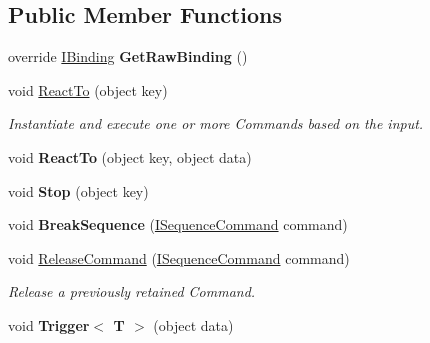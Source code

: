\subsection*{Public Member Functions}
\begin{DoxyCompactItemize}
\item 
\hypertarget{classbabel_1_1extensions_1_1sequencer_1_1impl_1_1_sequencer_a0fe228eb137de84cd46b58487ceb7c76}{override \hyperlink{interfacebabel_1_1framework_1_1api_1_1_i_binding}{I\-Binding} {\bfseries Get\-Raw\-Binding} ()}\label{classbabel_1_1extensions_1_1sequencer_1_1impl_1_1_sequencer_a0fe228eb137de84cd46b58487ceb7c76}

\item 
void \hyperlink{classbabel_1_1extensions_1_1sequencer_1_1impl_1_1_sequencer_ae500097b6bd29ca92f41db53aa7130e5}{React\-To} (object key)
\begin{DoxyCompactList}\small\item\em Instantiate and execute one or more Commands based on the input. \end{DoxyCompactList}\item 
\hypertarget{classbabel_1_1extensions_1_1sequencer_1_1impl_1_1_sequencer_ab808d0027b07746779ad4be4c16e0300}{void {\bfseries React\-To} (object key, object data)}\label{classbabel_1_1extensions_1_1sequencer_1_1impl_1_1_sequencer_ab808d0027b07746779ad4be4c16e0300}

\item 
\hypertarget{classbabel_1_1extensions_1_1sequencer_1_1impl_1_1_sequencer_a5d45304f208e89185a37ccbdbde4bd54}{void {\bfseries Stop} (object key)}\label{classbabel_1_1extensions_1_1sequencer_1_1impl_1_1_sequencer_a5d45304f208e89185a37ccbdbde4bd54}

\item 
\hypertarget{classbabel_1_1extensions_1_1sequencer_1_1impl_1_1_sequencer_ab175e762f3724890085ab3067c450df0}{void {\bfseries Break\-Sequence} (\hyperlink{interfacebabel_1_1extensions_1_1sequencer_1_1api_1_1_i_sequence_command}{I\-Sequence\-Command} command)}\label{classbabel_1_1extensions_1_1sequencer_1_1impl_1_1_sequencer_ab175e762f3724890085ab3067c450df0}

\item 
void \hyperlink{classbabel_1_1extensions_1_1sequencer_1_1impl_1_1_sequencer_a0302109e4c69305f4387e35a18c35da3}{Release\-Command} (\hyperlink{interfacebabel_1_1extensions_1_1sequencer_1_1api_1_1_i_sequence_command}{I\-Sequence\-Command} command)
\begin{DoxyCompactList}\small\item\em Release a previously retained Command. \end{DoxyCompactList}\item 
\hypertarget{classbabel_1_1extensions_1_1sequencer_1_1impl_1_1_sequencer_a9c46e67a7abc80aca518c8e27261357e}{void {\bfseries Trigger$<$ T $>$} (object data)}\label{classbabel_1_1extensions_1_1sequencer_1_1impl_1_1_sequencer_a9c46e67a7abc80aca518c8e27261357e}


\end{DoxyCompactItemize}
